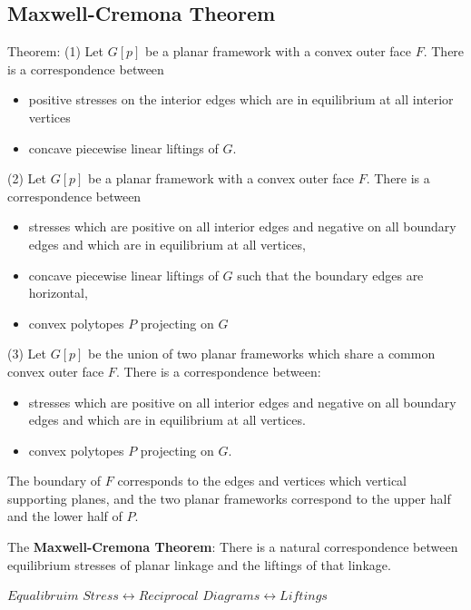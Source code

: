 \documentclass[english]{article}
\begin{document}
 \subsection{Maxwell-Cremona Theorem}
 Theorem: (1) Let $G[p]$ be a planar framework with a convex outer face $F$. There is a correspondence between
 \begin{itemize}
 	\item positive stresses on the interior edges which are in equilibrium at all interior vertices
	\item concave piecewise linear liftings of $G$.
 \end{itemize}
 (2) Let $G[p]$ be a planar framework with a convex outer face $F$. There is a correspondence between
 \begin{itemize}
 	\item stresses which are positive on all interior edges and negative on all boundary edges and which are in equilibrium at all vertices,
	\item concave piecewise linear liftings of $G$ such that the boundary edges are horizontal,
	\item convex polytopes $P$ projecting on $G$
 \end{itemize}
 (3) Let $G[p]$ be the union of two planar frameworks which share a common convex outer face $F$. There is a correspondence between:
 \begin{itemize}
 	\item stresses which are positive on all interior edges and negative on all boundary edges and which are in equilibrium at all vertices.
	\item convex polytopes $P$ projecting on $G$.
 \end{itemize}
 
 The boundary of $F$ corresponds to the edges and vertices which vertical supporting planes, and the two planar frameworks correspond to the upper half and the lower half of $P$.
 
 The \textbf{Maxwell-Cremona Theorem}: There is a natural correspondence between equilibrium stresses of planar linkage and the liftings of that linkage. 
 
 $Equalibruim$  $Stress \leftrightarrow Reciprocal$ $Diagrams \leftrightarrow Liftings$
 
\end{document}

